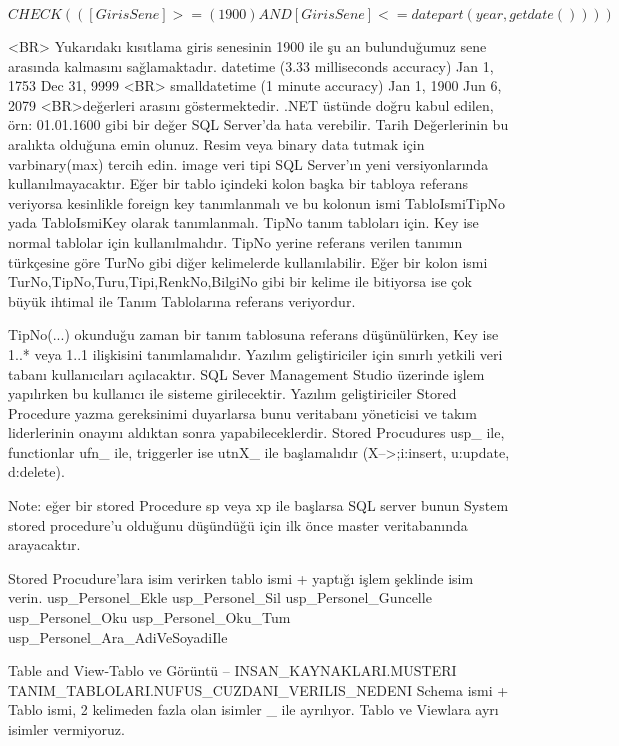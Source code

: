 \documentclass[10pt,a4paper,draft]{article}
\begin{document}
  $  CHECK  (([GirisSene]>=(1900) AND   [GirisSene]<=datepart(year,getdate()))) $
  
  			 <BR>			Yukarıdakı kısıtlama 
  giris senesinin 1900 ile şu an bulunduğumuz sene arasında kalmasını 
  sağlamaktadır.								 
  				datetime (3.33 milliseconds accuracy)  	Jan 1, 1753  	Dec 31, 9999
  				 <BR>				smalldatetime (1 minute accuracy) 	Jan 1, 1900 	Jun 6, 2079		
  				 <BR>değerleri arasını göstermektedir. .NET üstünde doğru kabul edilen, 
  örn: 01.01.1600 gibi bir değer SQL Server'da				hata verebilir. Tarih 
  Değerlerinin bu aralıkta olduğuna emin olunuz.						 
  			Resim veya binary data tutmak için varbinary(max) tercih edin. image 
  veri tipi SQL Server'ın yeni versiyonlarında			kullanılmayacaktır.		 
  			Eğer bir tablo içindeki kolon başka bir tabloya referans veriyorsa 
  kesinlikle foreign key tanımlanmalı ve bu			kolonun ismi TabloIsmiTipNo yada 
  TabloIsmiKey olarak tanımlanmalı. TipNo tanım tabloları için. Key ise normal 
  tablolar			için kullanılmalıdır.	
    TipNo yerine referans verilen tanımın türkçesine göre TurNo
    gibi diğer kelimelerde kullanılabilir.
    Eğer bir kolon ismi TurNo,TipNo,Turu,Tipi,RenkNo,BilgiNo
    gibi bir kelime ile bitiyorsa ise çok büyük ihtimal ile
    Tanım Tablolarına referans veriyordur.
    

  
  			TipNo(...) okunduğu zaman bir tanım tablosuna referans düşünülürken, Key ise 
  1..* veya 1..1 ilişkisini tanımlamalıdır.		 
  			Yazılım geliştiriciler için sınırlı yetkili veri tabanı kullanıcıları 
  açılacaktır. SQL Sever Management Studio üzerinde işlem			yapılırken bu 
  kullanıcı ile sisteme girilecektir.		 
  			Yazılım geliştiriciler Stored Procedure yazma gereksinimi duyarlarsa 
  bunu veritabanı yöneticisi ve takım liderlerinin onayını			 aldıktan sonra 
  yapabileceklerdir.		 
  			Stored Procudures usp\_ ile, functionlar ufn\_ ile, triggerler ise 
  utnX\_ ile başlamalıdır (X-->;i:insert, u:update, d:delete). 			
  
  
  Note: eğer bir 
  stored Procedure sp veya xp ile başlarsa SQL server 			bunun System stored 
  procedure'u olduğunu düşündüğü için ilk önce master veritabanında arayacaktır. 
  
  
  Stored Procudure'lara isim verirken tablo ismi + yaptığı işlem şeklinde 
  isim verin.
		usp\_Personel\_Ekle			usp\_Personel\_Sil			 
		usp\_Personel\_Guncelle		usp\_Personel\_Oku			 
		usp\_Personel\_Oku\_Tum		usp\_Personel\_Ara\_AdiVeSoyadiIle
  
     Table and View-Tablo ve Görüntü 
     -- 
    INSAN\_KAYNAKLARI.MUSTERI 
      			TANIM\_TABLOLARI.NUFUS\_CUZDANI\_VERILIS\_NEDENI 
    Schema ismi + Tablo ismi, 2 kelimeden fazla olan isimler \_ ile 
      ayrılıyor. Tablo ve Viewlara ayrı isimler vermiyoruz.		  
  
\end{document}
